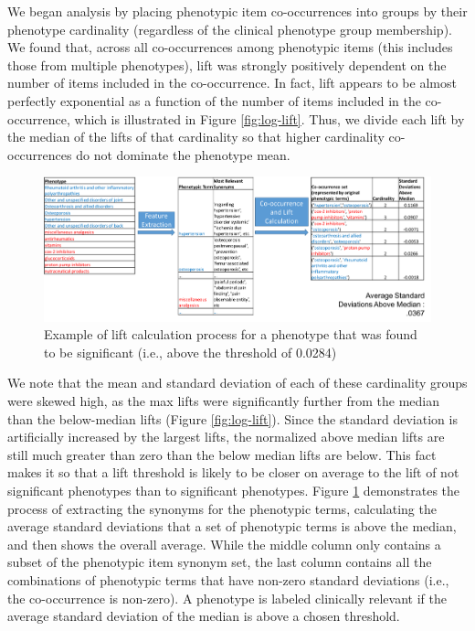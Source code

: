 \documentclass{sig-alternate-05-2015}
\begin{document}
We began analysis by placing phenotypic item co-occurrences into groups by their phenotype cardinality (regardless of the clinical phenotype group membership). 
We found that, across all co-occurrences among phenotypic items (this includes those from multiple phenotypes), lift was strongly positively dependent on the number of items included in the co-occurrence.
In fact, lift appears to be almost perfectly exponential as a function of the number of items included in the co-occurrence, which is illustrated in Figure \ref{fig:log-lift}. 
Thus, we divide each lift by the median of the lifts of that cardinality so that higher cardinality co-occurrences do not dominate the phenotype mean. 

\begin{figure} [t]
\centering
\includegraphics[width=\linewidth]{lift-process-cartoon.png}
\caption{Example of lift calculation process for a phenotype that was found to be significant (i.e., above the threshold of 0.0284)}
\label{fig:lift-process-cartoon}
\end{figure}



We note that the mean and standard deviation of each of these cardinality groups were skewed high, as the max lifts were significantly further from the median than the below-median lifts (Figure \ref{fig:log-lift}). Since the standard deviation is artificially increased by the largest lifts, the normalized above median lifts are still much greater than zero than the below median lifts are below. 
This fact makes it so that a lift threshold is likely to be closer on average to the lift of not significant phenotypes than to significant phenotypes.
Figure \ref{fig:lift-process-cartoon} demonstrates the process of extracting the synonyms for the phenotypic terms, calculating the average standard deviations that a set of phenotypic terms is above the median, and then shows the overall average.
While the middle column only contains a subset of the phenotypic item synonym set, the last column contains all the combinations of phenotypic terms that have non-zero standard deviations (i.e., the co-occurrence is non-zero).
A phenotype is labeled clinically relevant if the average standard deviation of the median is above a chosen threshold.
\end{document}
